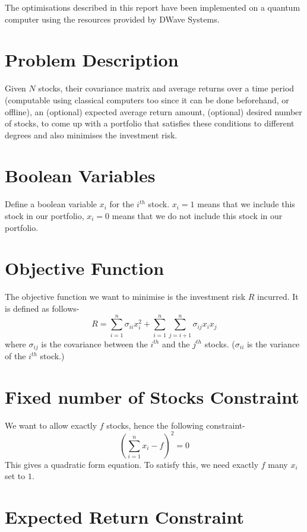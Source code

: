 \documentclass[a4paper]{report}
\begin{document}
The optimisations described in this report have been implemented on a quantum computer using the resources provided by DWave Systems.

\section{Problem Description}
Given $N$ stocks, their covariance matrix and average returns over a time period (computable using classical computers too since it can be done beforehand, or offline),
an (optional) expected average return amount, (optional) desired number of stocks, to come up with a portfolio that satisfies
these conditions to different degrees and also minimises the investment risk.

\section{Boolean Variables}
Define a boolean variable $x_i$ for the $i^{th}$ stock. $x_i = 1$ means that we include this stock in our portfolio, 
$x_i = 0$ means that we do not include this stock in our portfolio.

\section{Objective Function}
The objective function we want to minimise is the investment risk $R$ incurred. It is defined as follows-
$$ R = \sum\limits_{i = 1}^{n}\sigma_{ii}x_i^2 + \sum\limits_{i = 1}^{n}\sum\limits_{j = i + 1}^{n}\sigma_{ij}x_ix_j$$
where $\sigma_{ij}$ is the covariance between the $i^{th}$ and the $j^{th}$ stocks. ($\sigma_{ii}$ is the variance of
the $i^{th}$ stock.)
\section{Fixed number of Stocks Constraint}
We want to allow exactly $f$ stocks, hence the following constraint-
$$(\sum\limits_{i = 1}^{n} x_i - f)^2 = 0$$
This gives a quadratic form equation. To satisfy this, we need exactly $f$ many $x_i$ set to $1$.
\section{Expected Return Constraint}
\end{document}
